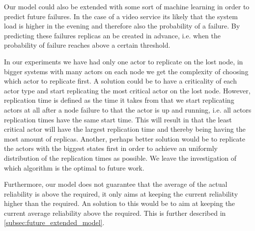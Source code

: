 \documentclass{cslthse-msc}
\begin{document}
Our model could also be extended with some sort of machine learning in order to predict future failures. In the case of a video service its likely that the system load is higher in the evening and therefore also the probability of a failure. By predicting these failures replicas an be created in advance, i.e. when the probability of failure reaches above a certain threshold.

In our experiments we have had only one actor to replicate on the lost node, in bigger systems with many actors on each node we get the complexity of choosing which actor to replicate first. A solution could be to have a criticality of each actor type and start replicating the most critical actor on the lost node. However, replication time is defined as the time it takes from that we start replicating actors at all after a node failure to that the actor is up and running, i.e. all actors replication times have the same start time. This will result in that the least critical actor will have the largest replication time and thereby being having the most amount of replicas. 
Another, perhaps better solution would be to replicate the actors with the biggest states first in order to achieve an uniformly distribution of the replication times as possible. We leave the investigation of which algorithm is the optimal to future work.

Furthermore, our model does not guarantee that the average of the actual reliability is above the required, it only aims at keeping the current reliability higher than the required. An solution to this would be to aim at keeping the current average reliability above the required. This is further described in \cref{subsec:future_extended_model}. 

\end{document}
